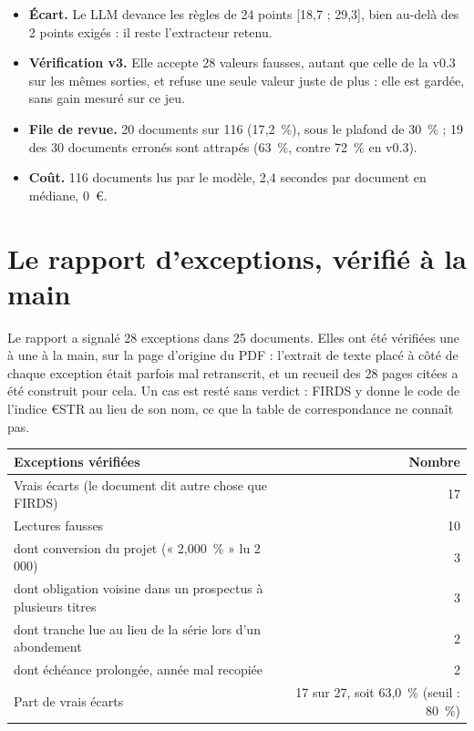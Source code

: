 \documentclass[11pt,a4paper]{article}
\begin{document}
\begin{itemize}
  \item \textbf{Écart.} Le LLM devance les règles de 24 points [18,7 ; 29,3], bien au-delà des 2 points exigés : il reste l'extracteur retenu.
  \item \textbf{Vérification v3.} Elle accepte 28 valeurs fausses, autant que celle de la v0.3 sur les mêmes sorties, et refuse une seule valeur juste de plus : elle est gardée, sans gain mesuré sur ce jeu.
  \item \textbf{File de revue.} 20 documents sur 116 (17,2~\%), sous le plafond de 30~\% ; 19 des 30 documents erronés sont attrapés (63~\%, contre 72~\% en v0.3).
  \item \textbf{Coût.} 116 documents lus par le modèle, 2,4 secondes par document en médiane, 0~€.
\end{itemize}

\section{Le rapport d'exceptions, vérifié à la main}

Le rapport a signalé 28 exceptions dans 25 documents. Elles ont été vérifiées une à une à la main, sur la page d'origine du PDF : l'extrait de texte placé à côté de chaque exception était parfois mal retranscrit, et un recueil des 28 pages citées a été construit pour cela. Un cas est resté sans verdict : FIRDS y donne le code de l'indice €STR au lieu de son nom, ce que la table de correspondance ne connaît pas.

\begin{table}[H]
\small
\begin{tabularx}{\linewidth}{Yr}
\toprule
\textbf{Exceptions vérifiées} & \textbf{Nombre} \\
\midrule
Vrais écarts (le document dit autre chose que FIRDS) & 17 \\
Lectures fausses & 10 \\
\quad dont conversion du projet (« 2,000~\% » lu 2\,000) & 3 \\
\quad dont obligation voisine dans un prospectus à plusieurs titres & 3 \\
\quad dont tranche lue au lieu de la série lors d'un abondement & 2 \\
\quad dont échéance prolongée, année mal recopiée & 2 \\
\midrule
Part de vrais écarts & 17 sur 27, soit 63,0~\% (seuil : 80~\%) \\
\bottomrule
\end{tabularx}
\end{table}
\end{document}
